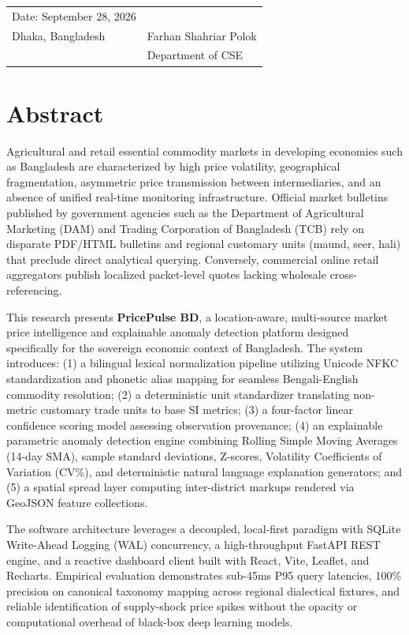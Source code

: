 \documentclass[12pt,a4paper,oneside]{report}
\begin{document}
\vspace{1.5cm}
\noindent
\begin{tabular}{@{}p{3.5in}p{2.5in}@{}}
Date: September 28, 2026 & \dotfill \\
Dhaka, Bangladesh & Farhan Shahriar Polok \\
& Department of CSE
\end{tabular}

\newpage

\chapter*{Abstract}
Agricultural and retail essential commodity markets in developing economies such as Bangladesh are characterized by high price volatility, geographical fragmentation, asymmetric price transmission between intermediaries, and an absence of unified real-time monitoring infrastructure. Official market bulletins published by government agencies such as the Department of Agricultural Marketing (DAM) and Trading Corporation of Bangladesh (TCB) rely on disparate PDF/HTML bulletins and regional customary units (maund, seer, hali) that preclude direct analytical querying. Conversely, commercial online retail aggregators publish localized packet-level quotes lacking wholesale cross-referencing.

This research presents \textbf{PricePulse BD}, a location-aware, multi-source market price intelligence and explainable anomaly detection platform designed specifically for the sovereign economic context of Bangladesh. The system introduces: (1) a bilingual lexical normalization pipeline utilizing Unicode NFKC standardization and phonetic alias mapping for seamless Bengali-English commodity resolution; (2) a deterministic unit standardizer translating non-metric customary trade units to base SI metrics; (3) a four-factor linear confidence scoring model assessing observation provenance; (4) an explainable parametric anomaly detection engine combining Rolling Simple Moving Averages (14-day SMA), sample standard deviations, Z-scores, Volatility Coefficients of Variation (CV\%), and deterministic natural language explanation generators; and (5) a spatial spread layer computing inter-district markups rendered via GeoJSON feature collections. 

The software architecture leverages a decoupled, local-first paradigm with SQLite Write-Ahead Logging (WAL) concurrency, a high-throughput FastAPI REST engine, and a reactive dashboard client built with React, Vite, Leaflet, and Recharts. Empirical evaluation demonstrates sub-45ms P95 query latencies, 100\% precision on canonical taxonomy mapping across regional dialectical fixtures, and reliable identification of supply-shock price spikes without the opacity or computational overhead of black-box deep learning models.
\end{document}
